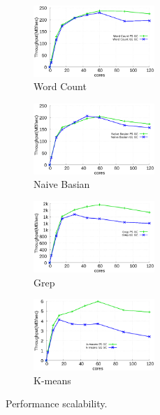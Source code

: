 \begin{figure}[tb]
    \centering
    \begin{subfigure}[b]{0.25\textwidth}
        \includegraphics[width=1.8in]{graph/wc.eps}
        \caption{Word Count}
    \end{subfigure}%
    \begin{subfigure}[b]{0.25\textwidth}
        \includegraphics[width=1.8in]{graph/nb.eps}
        \caption{Naive Basian}
    \end{subfigure}%
    \begin{subfigure}[b]{0.25\textwidth}
        \includegraphics[width=1.8in]{graph/grep.eps}
        \caption{Grep}
    \end{subfigure}%
    \begin{subfigure}[b]{0.25\textwidth}
        \includegraphics[width=1.8in]{graph/kmeans.eps}
        \caption{K-means}
    \end{subfigure}%
    \caption{Performance scalability.}
    \label{fig:scalability}
\end{figure}



